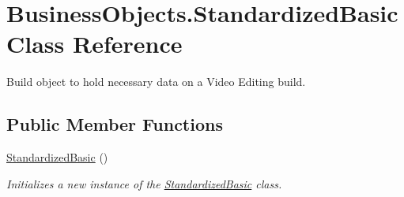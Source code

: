 \hypertarget{class_business_objects_1_1_standardized_basic}{}\section{Business\+Objects.\+Standardized\+Basic Class Reference}
\label{class_business_objects_1_1_standardized_basic}


Build object to hold necessary data on a Video Editing build.  


\subsection*{Public Member Functions}
\begin{DoxyCompactItemize}
\item 
\hyperlink{class_business_objects_1_1_standardized_basic_a4c81e7aee14a5030d14a336b9ee90605}{Standardized\+Basic} ()
\begin{DoxyCompactList}\small\item\em Initializes a new instance of the \hyperlink{class_business_objects_1_1_standardized_basic}{Standardized\+Basic} class. \end{DoxyCompactList}\end{DoxyCompactItemize}
